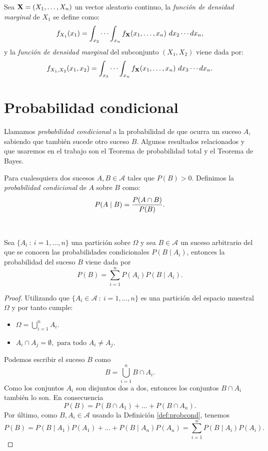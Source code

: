 \documentclass[oneside,openright,titlepage,numbers=noenddot,openany,headinclude,footinclude=true,
cleardoublepage=empty,abstractoff,BCOR=5mm,paper=a4,fontsize=12pt,main=spanish]{scrreprt}
\begin{document}
\begin{definition}
Sea $\textbf{X}=(X_1,\dots,X_n)$ un vector aleatorio continuo, la \textit{función de densidad marginal} de $X_1$ se define como: $$f_{X_1}(x_1)=\int_{x_2} \cdots \int_{x_n} f_{\textbf{X}}(x_1,\dots,x_n) \ dx_2\cdots dx_n,$$
y la \textit{función de densidad marginal} del subconjunto $(X_1,X_2)$ viene dada por:
$$f_{X_1,X_2}(x_1,x_2)=\int_{x_3} \cdots \int_{x_n} f_{\textbf{X}}(x_1,\dots,x_n) \ dx_3\cdots dx_n.$$
\end{definition}

\section{Probabilidad condicional}

Llamamos \textit{probabilidad condicional} a la probabilidad de que ocurra un suceso $A$, sabiendo que también sucede otro suceso $B$. Algunos resultados relacionados y que usaremos en el trabajo son el Teorema de probabilidad total y el Teorema de Bayes.\\

\begin{definition} \label{def:probcond}
Para cualesquiera dos sucesos $A,B \in \mathcal{A}$ tales que $P(B) > 0$. Definimos la \textit{probabilidad condicional} de $A$ sobre $B$ como: $$P(A \mid B)=\frac{\displaystyle P(A\cap B)}{\displaystyle P(B)}.$$
\end{definition}\

\begin{theorem} \label{th:probtotal}
Sea $\{A_i \ : \ i=1,\dots,n\}$ una partición sobre $\Omega$ y sea $B\in \mathcal{A}$ un suceso arbitrario del que se conocen las probabilidades condicionales $P(B \mid A_i)$, entonces la probabilidad del suceso $B$ viene dada por $$P(B)=\sum_{i=1}^n P(A_i) P(B \mid A_i).$$
\end{theorem}

\begin{proof}
Utilizando que $\{A_i\in \mathcal{A} \ : \ i=1,\dots,n\}$ es una partición del espacio muestral $\Omega$ y por tanto cumple: 

\begin{itemize}
    \item $\displaystyle \Omega=\bigcup_{i=1}^n A_i$.
    \item $\displaystyle A_i \cap A_j = \emptyset, \text{ para todo } A_i\neq A_j.$
\end{itemize}

Podemos escribir el suceso $B$ como $$B=\bigcup_{i=1}^n B \cap A_i.$$ 
Como los conjuntos $A_i$ son disjuntos dos a dos, entonces los conjuntos $B\cap A_i$ también lo son. En consecuencia $$P(B)= P(B\cap A_1)+\dots+P(B\cap A_n).$$
Por último, como $B,A_i\in \mathcal{A}$ usando la Definición \ref{def:probcond}, tenemos $$P(B)=P(B \mid A_1) P(A_1)+\dots+P(B \mid A_n) P(A_n)=\sum_{i=1}^n P(B \mid A_i) P(A_i).$$
\end{proof}
\end{document}
